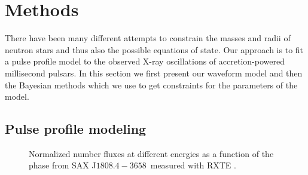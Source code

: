 \documentclass{wihuri}
\def\source{SAX J$1808.4-3658$}
\begin{document}
\fi

\clearpage

\section{Methods}


There have been many different attempts to constrain the masses and radii of neutron stars and thus also the possible equations of state. Our approach is to fit a pulse profile model to the observed X-ray oscillations of accretion-powered millisecond pulsars. In this section we first present our waveform model and then the Bayesian methods which we use to get constraints for the parameters of the model. %

\subsection{Pulse profile modeling}


\begin{figure}
\centerline{} 
\caption{Normalized number fluxes at different energies as a function of the phase from \source \ measured with RXTE . 
\label{fig:saxdata}}
\end{figure}
\end{document}
